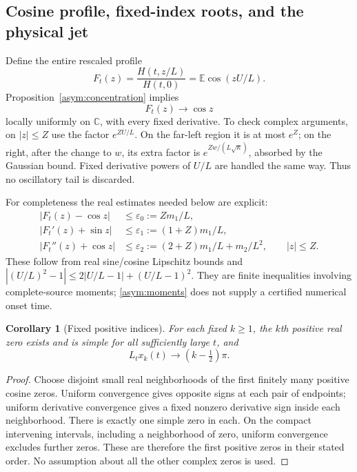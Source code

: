 \documentclass[11pt]{article}
\newtheorem{corollary}[theorem]{Corollary}
\theoremstyle{definition}
\newcommand{\C}{\mathbb C}
\begin{document}
\subsection{Cosine profile, fixed-index roots, and the physical jet}
Define the entire rescaled profile
\begin{equation}\label{asym:F}
 F_t(z)=\frac{H(t,z/L)}{H(t,0)}=\mathbb E\cos(zU/L).
\end{equation}
Proposition~\ref{asym:concentration} implies
\begin{equation}\label{asym:cosine-limit}
 F_t(z)\longrightarrow\cos z
\end{equation}
locally uniformly on $\C$, with every fixed derivative.  To check
complex arguments, on $|z|\le Z$ use the factor $e^{ZU/L}$.
On the far-left region it is at most $e^Z$; on the right, after the
change to $w$, its extra factor is $e^{Zw/(L\sqrt\kappa)}$,
absorbed by the Gaussian bound.  Fixed derivative powers of $U/L$
are handled the same way.  Thus no oscillatory tail is discarded.

For completeness the real estimates needed below are explicit:
\begin{align}
 |F_t(z)-\cos z|&\le\varepsilon_0:=Zm_1/L,\nonumber\\
 |F_t'(z)+\sin z|&\le\varepsilon_1:=(1+Z)m_1/L,\label{asym:C2-errors}\\
 |F_t''(z)+\cos z|&\le\varepsilon_2:=(2+Z)m_1/L+m_2/L^2,
 \qquad |z|\le Z.\nonumber
\end{align}
These follow from real sine/cosine Lipschitz bounds and
$|(U/L)^2-1|\le2|U/L-1|+(U/L-1)^2$.
They are finite inequalities involving complete-source moments;
\eqref{asym:moments} does not supply a certified numerical onset time.

\begin{corollary}[Fixed positive indices]\label{asym:fixed-roots}
For each fixed $k\ge1$, the $k$th positive real zero exists and is simple
for all sufficiently large $t$, and
\begin{equation}\label{asym:root-limit}
 L_t x_k(t)\longrightarrow(k-\tfrac12)\pi.
\end{equation}
\end{corollary}
\begin{proof}
Choose disjoint small real neighborhoods of the first finitely many
positive cosine zeros.  Uniform convergence gives opposite signs at
each pair of endpoints; uniform derivative convergence gives a fixed
nonzero derivative sign inside each neighborhood.  There is exactly
one simple zero in each.  On the compact intervening intervals,
including a neighborhood of zero, uniform convergence excludes further
zeros.  These are therefore the first positive zeros in their stated
order.  No assumption about all the other complex zeros is used.
\end{proof}
\end{document}
